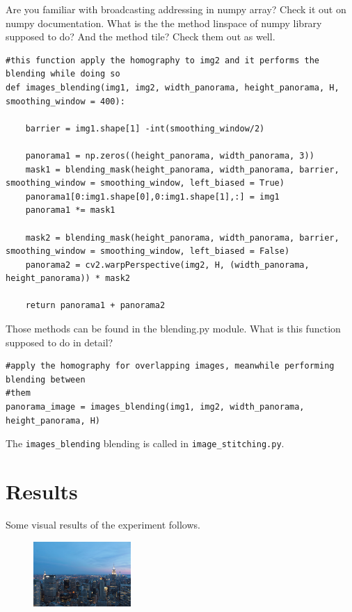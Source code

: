 \documentclass[aps,letterpaper,10pt]{revtex4}
\begin{document}
Are you familiar with broadcasting addressing in numpy array? Check it out on numpy documentation.
What is the the method linspace of numpy library supposed to do? And the method tile? Check them out as well.

\begin{lstlisting}
#this function apply the homography to img2 and it performs the blending while doing so
def images_blending(img1, img2, width_panorama, height_panorama, H, smoothing_window = 400):
    
    barrier = img1.shape[1] -int(smoothing_window/2)
    
    panorama1 = np.zeros((height_panorama, width_panorama, 3))
    mask1 = blending_mask(height_panorama, width_panorama, barrier, smoothing_window = smoothing_window, left_biased = True)
    panorama1[0:img1.shape[0],0:img1.shape[1],:] = img1
    panorama1 *= mask1
    
    mask2 = blending_mask(height_panorama, width_panorama, barrier, smoothing_window = smoothing_window, left_biased = False)
    panorama2 = cv2.warpPerspective(img2, H, (width_panorama, height_panorama)) * mask2
    
    return panorama1 + panorama2
\end{lstlisting}

Those methods can be found in the blending.py module. What is this function supposed to do in detail?

\begin{lstlisting}
#apply the homography for overlapping images, meanwhile performing blending between
#them
panorama_image = images_blending(img1, img2, width_panorama, height_panorama, H)
\end{lstlisting}

The \verb|images_blending| blending is called in \verb|image_stitching.py|.

\newpage
\section{Results}
Some visual results of the experiment follows.

\begin{figure}[h]
	\begin{center}
		\includegraphics[width=0.33\textwidth]{imgs/rockfeller_1.JPG}
	\end{center}
\label{First view of New York skyline.}
\end{figure}
\end{document}
